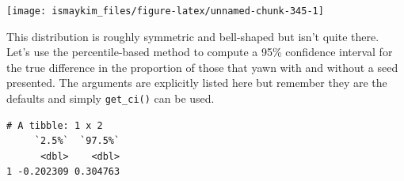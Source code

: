 \documentclass[12pt, krantz2,]{krantz}
\makeatletter
\newenvironment{Shaded}{\begin{snugshade}}{\end{snugshade}}
\newcommand{\DataTypeTok}[1]{\textcolor[rgb]{0.27,0.27,0.27}{#1}}
\newcommand{\DecValTok}[1]{\textcolor[rgb]{0.06,0.06,0.06}{#1}}
\newcommand{\FloatTok}[1]{\textcolor[rgb]{0.06,0.06,0.06}{#1}}
\newcommand{\KeywordTok}[1]{\textcolor[rgb]{0.27,0.27,0.27}{\textbf{#1}}}
\newcommand{\NormalTok}[1]{#1}
\newcommand{\OperatorTok}[1]{\textcolor[rgb]{0.43,0.43,0.43}{\textbf{#1}}}
\newcommand{\StringTok}[1]{\textcolor[rgb]{0.5,0.5,0.5}{#1}}
\newenvironment{kframe}{%
\medskip{}
\setlength{\fboxsep}{.8em}
 \def\at@end@of@kframe{}%
 \ifinner\ifhmode%
  \def\at@end@of@kframe{\end{minipage}}%
  \begin{minipage}{\columnwidth}%
 \fi\fi%
 \def\FrameCommand##1{\hskip\@totalleftmargin \hskip-\fboxsep
 \colorbox{shadecolor}{##1}\hskip-\fboxsep
     \hskip-\linewidth \hskip-\@totalleftmargin \hskip\columnwidth}%
 \MakeFramed {\advance\hsize-\width
   \@totalleftmargin\z@ \linewidth\hsize
   \@setminipage}}%
 {\par\unskip\endMakeFramed%
 \at@end@of@kframe}
\renewenvironment{Shaded}{\begin{kframe}}{\end{kframe}}
\makeatother
\begin{document}
\begin{Shaded}
\end{Shaded}

\begin{Shaded}
\end{Shaded}

\begin{center}\texttt{[image: ismaykim\_files/figure-latex/unnamed-chunk-345-1]} \end{center}

This distribution is roughly symmetric and bell-shaped but isn't quite there. Let's use the percentile-based method to compute a 95\% confidence interval for the true difference in the proportion of those that yawn with and without a seed presented. The arguments are explicitly listed here but remember they are the defaults and simply \texttt{get\_ci()} can be used.

\begin{Shaded}
\end{Shaded}

\begin{verbatim}
# A tibble: 1 x 2
     `2.5%`  `97.5%`
      <dbl>    <dbl>
1 -0.202309 0.304763
\end{verbatim}
\end{document}
